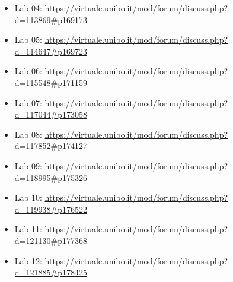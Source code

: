 \documentclass[12pt, a4paper]{report}
\begin{document}
\begin{itemize}
    \item Lab 04: \url{https://virtuale.unibo.it/mod/forum/discuss.php?d=113869#p169173}
    \item Lab 05: \url{https://virtuale.unibo.it/mod/forum/discuss.php?d=114647#p169723}
    \item Lab 06: \url{https://virtuale.unibo.it/mod/forum/discuss.php?d=115548#p171159}
    \item Lab 07: \url{https://virtuale.unibo.it/mod/forum/discuss.php?d=117044#p173058}
    \item Lab 08: \url{https://virtuale.unibo.it/mod/forum/discuss.php?d=117852#p174127}
    \item Lab 09: \url{https://virtuale.unibo.it/mod/forum/discuss.php?d=118995#p175326}
    \item Lab 10: \url{https://virtuale.unibo.it/mod/forum/discuss.php?d=119938#p176522}
    \item Lab 11: \url{https://virtuale.unibo.it/mod/forum/discuss.php?d=121130#p177368}
    \item Lab 12: \url{https://virtuale.unibo.it/mod/forum/discuss.php?d=121885#p178425}
\end{itemize}

\printbibliography
\end{document}
